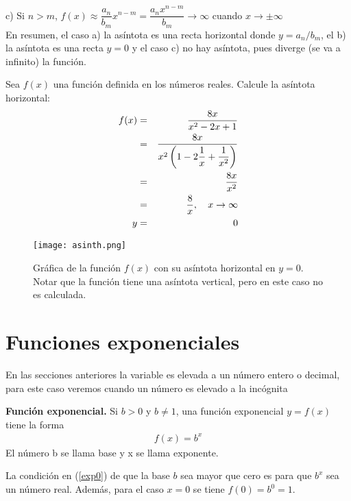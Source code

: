 \noindent c) Si $n>m$, $f(x)\approx \dfrac{a_{n}}{b_{m}}x^{n-m}= \dfrac{a_{n}x^{n-m}}{b_{m}}\rightarrow \infty$ cuando $x\rightarrow \pm\infty$\\
En resumen, el caso a) la asíntota es una recta horizontal donde $y= a_{n}/b_{m}$, el b) la asíntota es una recta $y=0$ y el caso c) no hay asíntota, pues diverge (se va a infinito) la función.
\begin{myexample}
Sea $f(x)$ una función definida en los números reales. Calcule la asíntota horizontal:
\begin{eqnarray*}
f(x)&=&\dfrac{8x}{x^{2}-2x+1}\\
&=&\dfrac{8x}{x^{2}\left(1-2\dfrac{1}{x}+\dfrac{1}{x^{2}}\right) }\\
&=&\dfrac{8x}{x^{2} }\\
&=&\dfrac{8}{x}, \hspace{10px} x\rightarrow \infty\\
y &=& 0 
\end{eqnarray*}

 \begin{center}
\begin{figure}[h!]
\centering
\texttt{[image: asinth.png]}
\caption[Gráfica de la función $f(x)$ con su asíntota horizontal en $y=0$.]{Gráfica de la función $f(x)$ con su asíntota horizontal en $y=0$. Notar que la función tiene una asíntota vertical, pero en este caso no es calculada.} \label{asintvert1}
\end{figure}
\end{center}
\end{myexample}

\section{Funciones exponenciales}
En las secciones anteriores la variable es elevada a un número entero o decimal, para este caso veremos cuando un número es  elevado a la incógnita
\begin{mydef}
\textbf{Función exponencial.} Si $b>0$ y $b\neq 1$, una función exponencial $y=f(x)$ tiene la forma\\
\begin{eqnarray}
f(x)=b^{x}
\label{exp0}
\end{eqnarray}
El número b se llama base y x se llama exponente.
\end{mydef}
La condición en (\ref{exp0}) de que la base $b$ sea mayor que cero es para que $b^{x}$ sea un número real. Además, para el caso $x=0$ se tiene $f(0)=b^{0}=1$.\\

